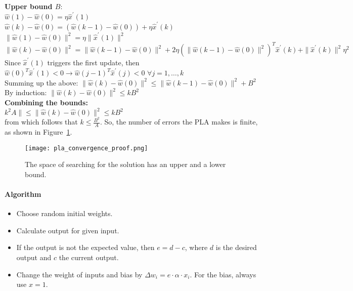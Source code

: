 \documentclass[main]{subfiles}
\begin{document}
\textbf{Upper bound $B$}:\\
\indent \indent $\hat{w}(1) - \hat{w}(0) = \eta \hat{x}^{\prime}(1)$\\
\indent \indent $\hat{w}(k) - \hat{w}(0) = (\hat{w}(k-1) - \hat{w}(0)) + \eta \hat{x}^{\prime}(k)$\\
\indent \indent $\| \hat{w}(1) - \hat{w}(0) \| ^2 = \eta \|\hat{x}^{\prime}(1) \|^2$\\
\indent \indent $\| \hat{w}(k) - \hat{w}(0) \|^2 = \| \hat{w}(k-1) - \hat{w}(0)\|^2 + 2 \eta (\| \hat{w}(k-1) - \hat{w}(0)\|^2)^T \hat{x}^{\prime}(k) + \|\hat{x}^{\prime}(k)\|^2 \eta^2$\\
\indent \indent Since $\hat{x}^{\prime}(1)$ triggers the first update, then $\hat{w}(0)^{T} \hat{x}^{\prime}(1) <0 \rightarrow \hat{w}(j-1)^T \hat{x}^{\prime}(j) < 0$ $\forall j = 1, \dots, k$\\
\indent \indent Summing up the above: $\| \hat{w}(k) - \hat{w}(0) \|^2 \leq \| \hat{w}(k-1) - \hat{w}(0)\|^2 + B^2$\\
\indent \indent By induction: $\| \hat{w}(k) - \hat{w}(0) \|^2 \leq k B^2$\\

\textbf{Combining the bounds:}\\
\indent \indent $k^2 A \| \leq \| \hat{w}(k) - \hat{w}(0) \|^2 \leq k B^2$\\
\indent \indent from which follows that $k \leq \frac{B^2}{A}$. So, the number of errors the PLA makes is finite, as shown in Figure~\ref{fig:pla_convergence_proof}.

\begin{figure}[h!]
	\centering
	\texttt{[image: pla\_convergence\_proof.png]}
	\caption{The space of searching for the solution has an upper and a lower bound.}
	\label{fig:pla_convergence_proof}
\end{figure}

\paragraph{Algorithm}
\begin{itemize}[noitemsep,nolistsep]
	\item Choose random initial weights.
	\item Calculate output for given input.
	\item If the output is not the expected value, then $e=d-c$, where $d$ is the desired output and $c$ the current output.
	\item Change the weight of inputs and bias by $\Delta w_i=e\cdot\alpha\cdot x_i$. For the bias, always use $x=1$.
\end{itemize}
\end{document}
